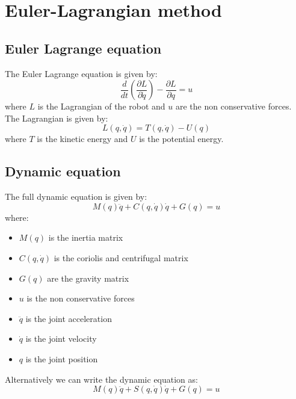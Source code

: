 \documentclass[a4paper,12pt]{article}
\begin{document}
\section{Euler-Lagrangian method}
\subsection{Euler Lagrange equation}
The Euler Lagrange equation is given by:
\begin{equation}
    \frac{d}{dt} \left( \frac{\partial L}{\partial \dot{q}} \right) - \frac{\partial L}{\partial q} = u
\end{equation}
where $L$ is the Lagrangian of the robot and $u$ are the non 
conservative forces.\\
The Lagrangian is given by:
\begin{equation}
    L(q,\dot{q})= T(q,\dot{q}) - U(q)
\end{equation}
where $T$ is the kinetic energy and $U$ is the potential energy.

\subsection{Dynamic equation}
The full dynamic equation is given by:
\begin{equation}
    M(q) \ddot{q} + C(q, \dot{q}) \dot{q} + G(q) = u
\end{equation}
where:
\begin{itemize}
    \item $M(q)$ is the inertia matrix
    \item $C(q, \dot{q})$ is the coriolis and centrifugal matrix
    \item $G(q)$ are the gravity matrix
    \item $u$ is the non conservative forces
    \item $\ddot{q}$ is the joint acceleration
    \item $\dot{q}$ is the joint velocity
    \item $q$ is the joint position
\end{itemize}
Alternatively we can write the dynamic equation as:
\begin{equation}
    M(q) \ddot{q} + S(q,\dot{q}) \dot{q} + G(q) = u
\end{equation}
\end{document}
